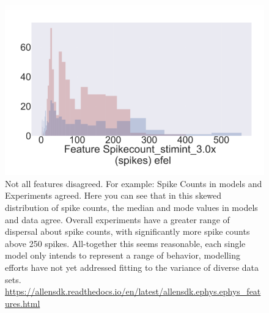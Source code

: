 \begin{figure}
    \centering
    \includegraphics[scale=0.75]{figures/spike_count_at_3rheobase.png}
    \caption[Features that agree. SpikeCount]{
    Not all features disagreed. For example: Spike Counts in models and Experiments agreed. Here you can see that in this skewed distribution of spike counts, the median and mode values in models and data agree. Overall experiments have a greater range of dispersal about spike counts, with significantly more spike counts above 250 spikes. All-together this seems reasonable, each single model only intends to represent a range of behavior, modelling efforts have not yet addressed fitting to the variance of diverse data sets.
    \url{https://allensdk.readthedocs.io/en/latest/allensdk.ephys.ephys_features.html}
    }
    \label{fig:from_poster_disagree}
\end{figure}


